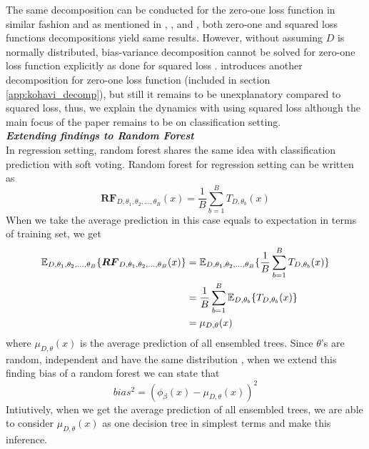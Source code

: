 The same decomposition can be conducted for the zero-one loss function in similar fashion and as mentioned in 
\cite{louppe2014understanding}, \cite{domingos2000decomposition}, 
\cite{james2003variance} and \cite{friedman1997zeroLoss},
both zero-one and squared loss functions decompositions yield same results. 
However, without assuming $D$ is normally distributed, bias-variance decomposition 
cannot be solved for zero-one loss function explicitly as done for squared loss \cite{louppe2014understanding}. 
\cite{kohavi1996bias} introduces another decomposition for zero-one loss function (included in section \ref{app:kohavi_decomp}), 
but still it remains to be unexplanatory compared to squared loss, thus, 
we explain the dynamics with using squared loss although the main focus of the paper remains to be on classification setting.
\vspace{2mm}
\\
\textbf{\emph{Extending findings to Random Forest }}\\
In regression setting, random forest shares the same idea with classification prediction with soft voting. 
Random forest for regression setting can be written as
\begin{equation}
\boldsymbol{RF}_{D, \theta_{1},\theta_{2},..., \theta_{B}}(x) = \dfrac{1}{B}\sum_{b = 1}^{B}T_{D,\theta_{b}}(x)
\end{equation}
When we take the average prediction in this case equals to expectation in terms of training set, we get
\begin{align}\label{eq:mu}
\mathbb{E}_{D, \theta_{1}, \theta_{2},..., \theta_{B}}\{\boldsymbol{RF}_{D, \theta_{1},\theta_{2},..., \theta_{B}}(x) \} 
	& = \mathbb{E}_{D, \theta_{1}, \theta_{2},..., \theta_{B}}\{\dfrac{1}{B}\sum_{b = 1}^{B}T_{D,\theta_{b}}(x)\} \notag \\
	& = \dfrac{1}{B}\sum_{b=1}^{B}\mathbb{E}_{D,\theta_{b}}\{T_{D, \theta_{b}}(x)\}\notag \\
	& = \mu_{D,\theta}(x)
\end{align}
where $\mu_{D,\theta}(x)$ is the average prediction of all ensembled trees. Since $\theta$'s are random, 
independent and have the same distribution \cite{louppe2014understanding}, when we extend this finding bias of a random forest 
we can state that 
\begin{equation}\label{eq:random_forest_bias}
bias^2 = (\phi_{\beta}(x) - \mu_{D,\theta}(x))^2
\end{equation}
Intiutively, when we get the average prediction of all ensembled trees, 
we are able to consider $\mu_{D,\theta}(x)$ as one decision tree in simplest terms and make this inference.
